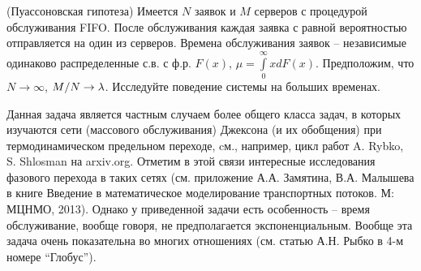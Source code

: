 \begin{problem}\Star(Пуассоновская гипотеза)  
Имеется $N$ заявок и $M$ 
серверов с процедурой обслуживания FIFO. После обслуживания каждая заявка с 
равной вероятностью отправляется на один из серверов. Времена обслуживания 
заявок -- независимые одинаково распределенные с.в. с ф.р. $F\left( x 
\right)$, $\mu =\int\limits_0^\infty {xdF\left( x \right)} $. Предположим, 
что $N\to \infty $, $M \mathord{\left/ {\vphantom {M N}} \right. 
\kern-\nulldelimiterspace} N\to \lambda $. Исследуйте поведение системы на 
больших временах.
\end{problem}

\begin{remark}
Данная задача является частным случаем более общего 
класса задач, в которых изучаются сети (массового обслуживания) Джексона (и 
их обобщения) при термодинамическом предельном переходе, cм., например, цикл 
работ A. Rybko, S. Shlosman на arxiv.org. Отметим в 
этой связи интересные исследования фазового перехода в таких сетях (см. 
приложение А.А. Замятина, В.А. Малышева в книге Введение в математическое 
моделирование транспортных потоков. М: МЦНМО, 2013). Однако у приведенной 
задачи есть особенность -- время обслуживание, вообще говоря, не 
предполагается экспоненциальным. Вообще эта задача очень показательна во 
многих отношениях (см. статью А.Н. Рыбко в 4-м номере ``Глобус'').
\end{remark}


